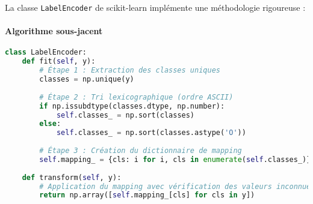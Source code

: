 \documentclass{article}
\begin{document}
La classe \texttt{LabelEncoder} de scikit-learn implémente une méthodologie rigoureuse \cite{pedregosa2011scikit} :

\paragraph*{Algorithme sous-jacent}

\begin{lstlisting}[language=Python]
class LabelEncoder:
    def fit(self, y):
        # Étape 1 : Extraction des classes uniques
        classes = np.unique(y)
        
        # Étape 2 : Tri lexicographique (ordre ASCII)
        if np.issubdtype(classes.dtype, np.number):
            self.classes_ = np.sort(classes)
        else:
            self.classes_ = np.sort(classes.astype('O'))
        
        # Étape 3 : Création du dictionnaire de mapping
        self.mapping_ = {cls: i for i, cls in enumerate(self.classes_)}
        
    def transform(self, y):
        # Application du mapping avec vérification des valeurs inconnues
        return np.array([self.mapping_[cls] for cls in y])
\end{lstlisting}




\end{document}
